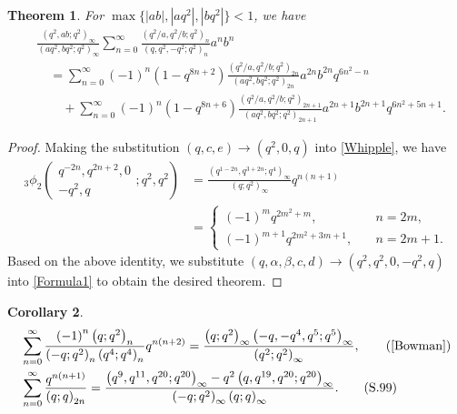 \documentclass[reqno,12pt]{amsart}
\newtheorem{theorem}{Theorem}[section]%
\newtheorem{corollary}[theorem]{Corollary}
\theoremstyle{remark}
\numberwithin{equation}{section}
\begin{document}
%
%
\begin{theorem}\label{thm13}
For $\max\{|ab|,|aq^2|,|bq^2|\}<1$, we have
\begin{align*}
&\frac{\left(q^2,ab;q^2\right)_{\infty}}{\left(aq^2,bq^2;q^2\right)_{\infty}}
\sum_{n=0}^{\infty}
\frac{\left(q^2/a,q^2/b;q^2\right)_n}{\left(q,q^2,-q^2;q^2\right)_n}a^nb^n\\
&\quad=\sum_{n=0}^{\infty}\left(-1\right)^n\left(1-q^{8n+2}\right)
\frac{\left(q^2/a,q^2/b;q^2\right)_{2n}}{\left(aq^2,bq^2;q^2\right)_{2n}}
a^{2n}b^{2n}q^{6n^2-n}\\
&\qquad+
\sum_{n=0}^{\infty}\left(-1\right)^n\left(1-q^{8n+6}\right)
\frac{\left(q^2/a,q^2/b;q^2\right)_{2n+1}}{\left(aq^2,bq^2;q^2\right)_{2n+1}}
a^{2n+1}b^{2n+1}q^{6n^2+5n+1}.
\end{align*}
\end{theorem}
\begin{proof}
Making the substitution $\left(q,c,e\right)\to\left(q^2,0,q\right)$ into \eqref{Whipple}, we have
\begin{align}
{_3\phi_2}\left(
\begin{array}{ccc}
q^{-2n},q^{2n+2},0\\
-q^2,q
\end{array};q^2,q^2\right)
&=
\frac{\left(q^{1-2n}, q^{3+2n};q^4\right)_{\infty}}
{\left(q;q^2\right)_{\infty}}q^{n\left(n+1\right)}\nonumber\\
&
=\left\{\begin{array}{ll}
\left(-1\right)^mq^{2m^2+m},&\quad {n=2m},\\
\left(-1\right)^{m+1}q^{2m^2+3m+1},&\quad{n=2m+1}.
\end{array}\right.\label{A20}
\end{align}
Based on the above identity,  we substitute $\left(q,\alpha,\beta,c,d\right)\to\left(q^2,q^2,0,-q^2,q\right)$ into \eqref{Formula1} to obtain the desired theorem.
\end{proof}
\begin{corollary}
\begin{align}
&\sum_{n=0}^{\infty}
\frac{\left(-1\right)^n\left(q;q^2\right)_n}{\left(-q;q^2\right)_n\left(q^4;q^4\right)_n}q^{n\left(n+2\right)}
=\frac{\left(q;q^2\right)_{\infty}\left(-q,-q^4,q^5;q^5\right)_{\infty}}{\left(q^2;q^2\right)_{\infty}},\tag{\rm{\cite[Eq. (2.23)]{Bowman}}}\label{N6}\\
&\sum_{n=0}^{\infty}\frac{q^{n\left(n+1\right)}}
{\left(q;q\right)_{2n}}
=\frac{\left(q^9,q^{11},q^{20};q^{20}\right)_{\infty}
-q^2\left(q,q^{19},q^{20};q^{20}\right)_{\infty}}
{\left(-q;q^2\right)_{\infty}\left(q;q\right)_{\infty}}.\tag{S.99}\label{S.99}
\end{align}
\end{corollary}
\end{document}
